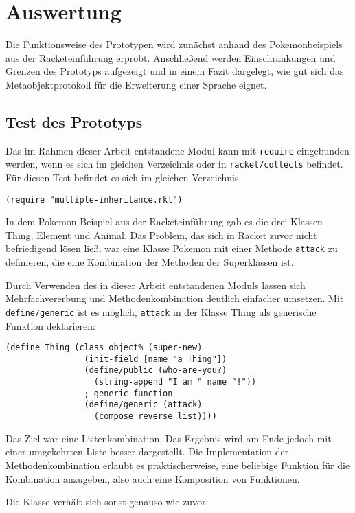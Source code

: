 \chapter{Auswertung}
Die Funktionsweise des Prototypen wird zunächst anhand des Pokemonbeispiels aus der Racketeinführung erprobt. Anschließend werden Einschränkungen und Grenzen des Prototyps aufgezeigt und in einem Fazit dargelegt, wie gut sich das Metaobjektprotokoll für die Erweiterung einer Sprache eignet.

\section{Test des Prototyps}
Das im Rahmen dieser Arbeit entstandene Modul kann mit \texttt{require} eingebunden werden, wenn es sich im gleichen Verzeichnis oder in \texttt{racket/collects} befindet. Für diesen Test befindet es sich im gleichen Verzeichnis.

\begin{lstlisting}
(require "multiple-inheritance.rkt")
\end{lstlisting}

In dem Pokemon-Beispiel aus der Racketeinführung gab es die drei Klassen Thing, Element und Animal. Das Problem, das sich in Racket zuvor nicht befriedigend lösen ließ, war eine Klasse Pokemon mit einer Methode \texttt{attack} zu definieren, die eine Kombination der Methoden der Superklassen ist. 

Durch Verwenden des in dieser Arbeit entstandenen Moduls lassen sich Mehrfachvererbung und Methodenkombination deutlich einfacher umsetzen. Mit \texttt{define/generic} ist es möglich, \texttt{attack} in der Klasse Thing als generische Funktion deklarieren:

\begin{lstlisting}
(define Thing (class object% (super-new)
                (init-field [name "a Thing"])
                (define/public (who-are-you?)
                  (string-append "I am " name "!"))
                ; generic function
                (define/generic (attack)
                  (compose reverse list))))
\end{lstlisting}

Das Ziel war eine Listenkombination. Das Ergebnis wird am Ende jedoch mit einer umgekehrten Liste besser dargestellt. Die Implementation der Methodenkombination erlaubt es praktischerweise, eine beliebige Funktion für die Kombination anzugeben, also auch eine Komposition von Funktionen.

Die Klasse verhält sich sonst genauso wie zuvor:

